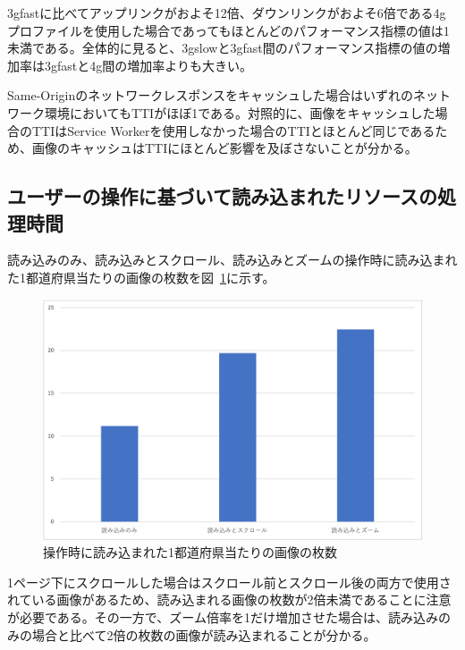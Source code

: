 3gfastに比べてアップリンクがおよそ12倍、ダウンリンクがおよそ6倍である4gプロファイルを使用した場合であってもほとんどのパフォーマンス指標の値は1未満である。全体的に見ると、3gslowと3gfast間のパフォーマンス指標の値の増加率は3gfastと4g間の増加率よりも大きい。

Same-Originのネットワークレスポンスをキャッシュした場合はいずれのネットワーク環境においてもTTIがほぼ1である。対照的に、画像をキャッシュした場合のTTIはService Workerを使用しなかった場合のTTIとほとんど同じであるため、画像のキャッシュはTTIにほとんど影響を及ぼさないことが分かる。

\subsection{ユーザーの操作に基づいて読み込まれたリソースの処理時間}
\label{subsection:ユーザーの操作に基づいて読み込まれたリソースの処理時間}
読み込みのみ、読み込みとスクロール、読み込みとズームの操作時に読み込まれた1都道府県当たりの画像の枚数を図~\ref{figure:操作時に読み込まれた1都道府県当たりの画像の枚数}に示す。

\begin{figure}
  \centering
  \includegraphics[width=\textwidth]{paper/images/loaded_image_count.png}
  \caption{操作時に読み込まれた1都道府県当たりの画像の枚数}\label{figure:操作時に読み込まれた1都道府県当たりの画像の枚数}
\end{figure}

1ページ下にスクロールした場合はスクロール前とスクロール後の両方で使用されている画像があるため、読み込まれる画像の枚数が2倍未満であることに注意が必要である。その一方で、ズーム倍率を1だけ増加させた場合は、読み込みのみの場合と比べて2倍の枚数の画像が読み込まれることが分かる。

